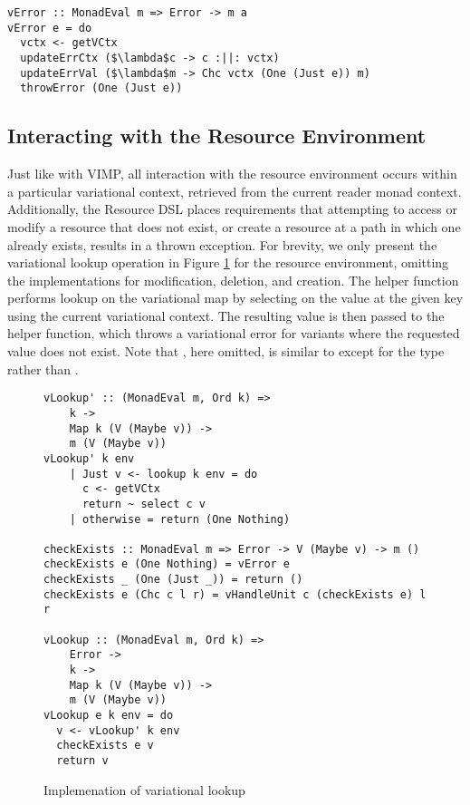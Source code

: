 \documentclass[12pt,oneside]{book}
\begin{document}
\begin{lstlisting}
vError :: MonadEval m => Error -> m a
vError e = do
  vctx <- getVCtx
  updateErrCtx ($\lambda$c -> c :||: vctx)
  updateErrVal ($\lambda$m -> Chc vctx (One (Just e)) m)
  throwError (One (Just e))
\end{lstlisting}

\subsection{Interacting with the Resource Environment}

Just like with VIMP, all interaction with the resource environment occurs within a particular variational context, retrieved
from the current reader monad context.
Additionally, the Resource DSL places requirements that attempting to access or modify a resource that does not exist,
or create a resource at a path in which one already exists, results in a thrown exception. For brevity, we only present the
variational lookup operation in Figure \ref{fig:vLookup} for the resource environment, omitting the implementations for modification, deletion, and creation.
The helper function  performs lookup on the variational map by selecting on the value at the given key using the current variational
context. The resulting value is then passed to the  helper function, which throws a variational error for variants where the
requested value does not exist.
Note that , here omitted, is similar to  except for the type  rather than .

\begin{figure}
\begin{lstlisting}
vLookup' :: (MonadEval m, Ord k) =>
    k ->
    Map k (V (Maybe v)) ->
    m (V (Maybe v))
vLookup' k env
    | Just v <- lookup k env = do
      c <- getVCtx
      return ~ select c v
    | otherwise = return (One Nothing)

checkExists :: MonadEval m => Error -> V (Maybe v) -> m ()
checkExists e (One Nothing) = vError e
checkExists _ (One (Just _)) = return ()
checkExists e (Chc c l r) = vHandleUnit c (checkExists e) l r

vLookup :: (MonadEval m, Ord k) =>
    Error ->
    k ->
    Map k (V (Maybe v)) ->
    m (V (Maybe v))
vLookup e k env = do
  v <- vLookup' k env
  checkExists e v
  return v
\end{lstlisting}
\caption{Implemenation of variational lookup}
\label{fig:vLookup}
\end{figure}
\end{document}
